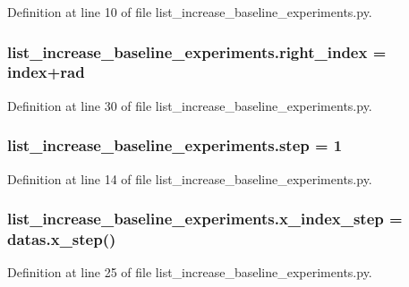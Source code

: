 Definition at line 10 of file list\+\_\+increase\+\_\+baseline\+\_\+experiments.\+py.

\subsubsection[{\texorpdfstring{right\+\_\+index}{right_index}}]{\setlength{\rightskip}{0pt plus 5cm}list\+\_\+increase\+\_\+baseline\+\_\+experiments.\+right\+\_\+index = {\bf index}+rad}\hypertarget{namespacelist__increase__baseline__experiments_a64b7b40b41912296df3830ee6be178f8}{}\label{namespacelist__increase__baseline__experiments_a64b7b40b41912296df3830ee6be178f8}


Definition at line 30 of file list\+\_\+increase\+\_\+baseline\+\_\+experiments.\+py.

\subsubsection[{\texorpdfstring{step}{step}}]{\setlength{\rightskip}{0pt plus 5cm}list\+\_\+increase\+\_\+baseline\+\_\+experiments.\+step = 1}\hypertarget{namespacelist__increase__baseline__experiments_a9ac4fa47a0cd897ac043a2c9cf9c49f9}{}\label{namespacelist__increase__baseline__experiments_a9ac4fa47a0cd897ac043a2c9cf9c49f9}


Definition at line 14 of file list\+\_\+increase\+\_\+baseline\+\_\+experiments.\+py.

\subsubsection[{\texorpdfstring{x\+\_\+index\+\_\+step}{x_index_step}}]{\setlength{\rightskip}{0pt plus 5cm}list\+\_\+increase\+\_\+baseline\+\_\+experiments.\+x\+\_\+index\+\_\+step = datas.\+x\+\_\+step()}\hypertarget{namespacelist__increase__baseline__experiments_ab2201bf911f43f516872f78b5863e3d8}{}\label{namespacelist__increase__baseline__experiments_ab2201bf911f43f516872f78b5863e3d8}


Definition at line 25 of file list\+\_\+increase\+\_\+baseline\+\_\+experiments.\+py.

